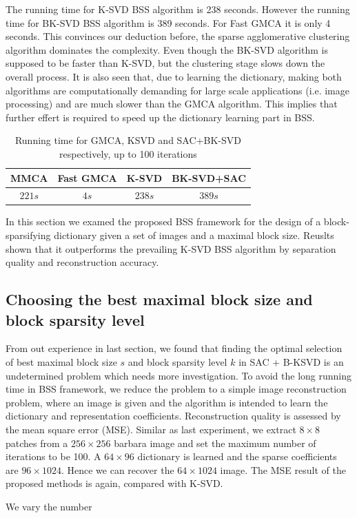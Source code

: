 The running time for K-SVD BSS algorithm is 238 seconds. However the running time for BK-SVD BSS algorithm is 389 seconds. For Fast GMCA it is only 4 seconds. This convinces our deduction before, the sparse agglomerative clustering algorithm dominates the complexity. Even though the BK-SVD algorithm is supposed to be faster than K-SVD, but the clustering stage slows down the overall process. It is also seen that, due to learning the dictionary, making both algorithms are computationally demanding for large scale applications (i.e. image processing) and are much slower than the GMCA algorithm. This implies that further effert is required to speed up the dictionary learning part in BSS. \\
\begin{table}[!htbp]
\centering
    \begin{tabular}{|c|c|c|c|}
    \hline
    MMCA & Fast GMCA & K-SVD & BK-SVD+SAC \\\hline
    $221s$ & $4s$ & $238s$ & $389s$ \\\hline
    \end{tabular}
    \caption{Running time for GMCA, KSVD and SAC+BK-SVD respectively, up to 100 iterations}
\end{table}

In this section we examed the proposed BSS framework for the design of a block-sparsifying dictionary given a set of images and a maximal block size. Reuslts shown that it outperforms the prevailing K-SVD BSS algorithm by separation quality and reconstruction accuracy.

\subsection{Choosing the best maximal block size and block sparsity level}
From out experience in last section, we found that finding the optimal selection of best maximal block size $s$ and block sparsity level $k$ in SAC + B-KSVD is an undetermined problem which needs more investigation. To avoid the long running time in BSS framework, we reduce the problem to a simple image reconstruction problem, where an image is given and the algorithm is intended to learn the dictionary and representation coefficients. Reconstruction quality is assessed by the mean square error (MSE). Similar as last experiment, we extract $8 \times 8$ patches from a $256 \times 256$ barbara image and set the maximum number of iterations to be 100. A $64 \times 96$ dictionary is learned and the sparse coefficients are $96\times1024$. Hence we can recover the $64\times1024$ image. The MSE result of the proposed methods is again, compared with K-SVD.

We vary the number

